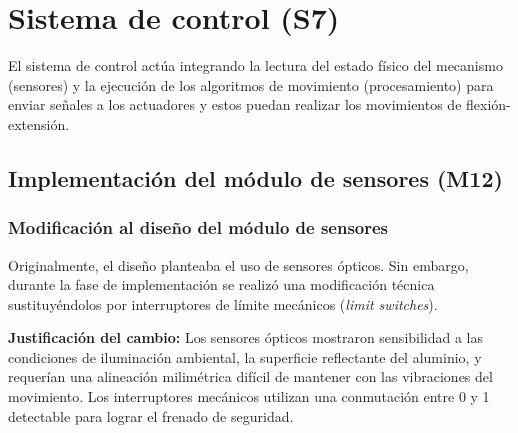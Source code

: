 \section{Sistema de control (S7)}
El sistema de control actúa integrando la lectura del estado físico del mecanismo (sensores) y la ejecución de los algoritmos de movimiento (procesamiento) para enviar señales a los actuadores y estos puedan realizar los movimientos de flexión-extensión.

\subsection{Implementación del módulo de sensores (M12)}
\subsubsection{Modificación al diseño del módulo de sensores}
Originalmente, el diseño planteaba el uso de sensores ópticos. Sin embargo, durante la fase de implementación se realizó una modificación técnica sustituyéndolos por interruptores de límite mecánicos (\textit{limit switches}). 

\textbf{Justificación del cambio:}
Los sensores ópticos mostraron sensibilidad a las condiciones de iluminación ambiental, la superficie reflectante del aluminio, y requerían una alineación milimétrica difícil de mantener con las vibraciones del movimiento. Los interruptores mecánicos utilizan una conmutación entre 0 y 1 detectable para lograr el frenado de seguridad.

